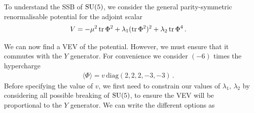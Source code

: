To understand the SSB of $\mathrm{SU}(5)$, we consider the general parity-symmetric renormalisable potential for the adjoint scalar
\begin{align}
    V=-\mu^2\operatorname{tr}\Phi^2+\lambda_1(\operatorname{tr}\Phi^2)^2+\lambda_2\operatorname{tr}\Phi^4\,.\label{eq:SU5pot}
\end{align}

We can now find a VEV of the potential. However, we must ensure that it commutes with the $Y$ generator. For convenience we consider $(-6)$ times the hypercharge
\begin{align}
    \langle\Phi\rangle=v\,\mathrm{diag}(2,2,2,-3,-3)\,.\label{eq:VEVdiag}
\end{align}
Before specifying the value of $v$, we first need to constrain our values of $\lambda_1,\,\lambda_2$ by considering all possible breaking of $\mathrm{SU}(5)$, to ensure the VEV will be proportional to the $Y$ generator. We can write the different options as 
